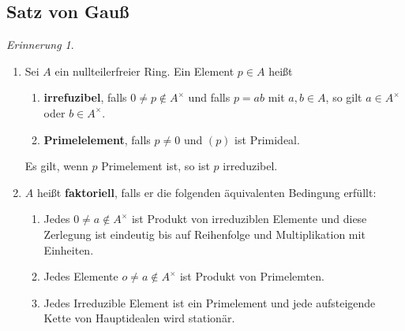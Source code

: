 \documentclass[10pt,a4paper]{article}
\newcounter{thm}[section]
\theoremstyle{definition}
\theoremstyle{plain}
\theoremstyle{remark}
\newtheorem{rem}[thm]{Erinnerung}
\begin{document}
\subsection{Satz von Gauß}

\begin{rem}\label{701rem}
\begin{enumerate}
	\item Sei $A$ ein nullteilerfreier Ring. Ein Element $p\in A$ heißt
		\begin{enumerate}
			\item \textbf{irrefuzibel}, falls $0\neq p\notin A^\times$ und falls $p=ab$ mit $a,b\in A$, so gilt $a\in A^\times$ oder $b\in A^\times$.
			\item \textbf{Primelelement}, falls $p\neq 0$ und $(p)$ ist Primideal.\\
		\end{enumerate}
		Es gilt, wenn $p$ Primelement ist, so ist $p$ irreduzibel.
	\item $A$ heißt \textbf{faktoriell}, falls er die folgenden äquivalenten Bedingung erfüllt:
	\begin{enumerate}
		\item Jedes $0\neq a\notin A^\times$ ist Produkt von irreduziblen Elemente und diese Zerlegung ist eindeutig bis auf Reihenfolge und Multiplikation mit Einheiten.
		\item Jedes Elemente $o\neq a\notin A^\times$ ist Produkt von Primelemten.
		\item Jedes Irreduzible Element ist ein Primelement und jede aufsteigende Kette von Hauptidealen wird stationär.
	\end{enumerate} 
\end{enumerate}
\end{rem}
\end{document}
